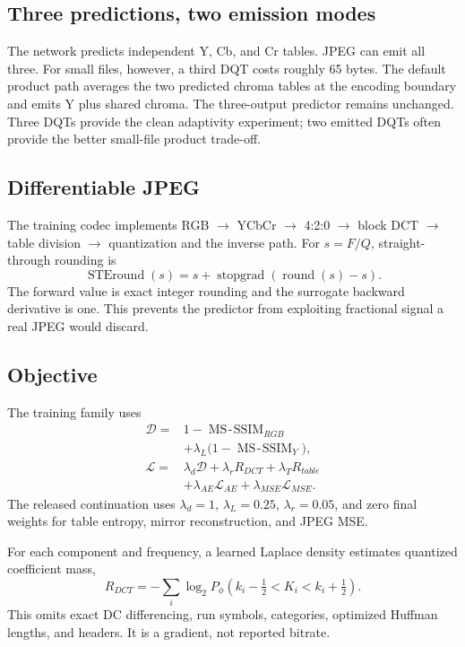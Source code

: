 \documentclass[10pt,twocolumn]{article}
\begin{document}
\subsection{Three predictions, two emission modes}

The network predicts independent Y, Cb, and Cr tables. JPEG can emit all three. For small files, however, a third DQT costs roughly 65 bytes. The default product path averages the two predicted chroma tables at the encoding boundary and emits Y plus shared chroma. The three-output predictor remains unchanged. Three DQTs provide the clean adaptivity experiment; two emitted DQTs often provide the better small-file product trade-off.

\subsection{Differentiable JPEG}

The training codec implements RGB $\rightarrow$ YCbCr $\rightarrow$ 4:2:0 $\rightarrow$ block DCT $\rightarrow$ table division $\rightarrow$ quantization and the inverse path. For $s=F/Q$, straight-through rounding is
\begin{equation}
 \operatorname{STEround}(s)=s+\operatorname{stopgrad}(\operatorname{round}(s)-s).
\end{equation}
The forward value is exact integer rounding and the surrogate backward derivative is one. This prevents the predictor from exploiting fractional signal a real JPEG would discard.

\subsection{Objective}

The training family uses
\begin{align}
\mathcal D={}&1-\operatorname{MS\!\text{-}\!SSIM}_{RGB} \nonumber\\
 &+\lambda_L\big(1-\operatorname{MS\!\text{-}\!SSIM}_{Y}\big),\\
\mathcal L={}&\lambda_d\mathcal D+\lambda_r R_{DCT}+\lambda_T R_{table} \nonumber\\
 &+\lambda_{AE}\mathcal L_{AE}+\lambda_{MSE}\mathcal L_{MSE}.
\end{align}
The released continuation uses $\lambda_d=1$, $\lambda_L=0.25$, $\lambda_r=0.05$, and zero final weights for table entropy, mirror reconstruction, and JPEG MSE.

For each component and frequency, a learned Laplace density estimates quantized coefficient mass,
\begin{equation}
R_{DCT}=-\sum_i\log_2 P_\phi(k_i-\tfrac12<K_i<k_i+\tfrac12).
\end{equation}
This omits exact DC differencing, run symbols, categories, optimized Huffman lengths, and headers. It is a gradient, not reported bitrate.
\end{document}
